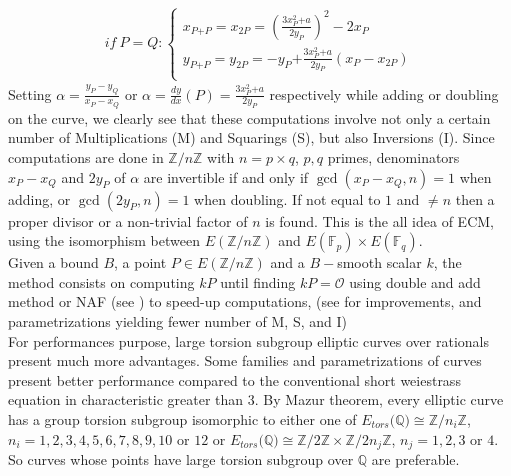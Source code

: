\documentclass[sigconf,balance=false]{acmart}
\begin{document}
\begin{enumerate}
\begin{eqnarray*}
 if \ P=Q:
\left\lbrace
\begin{array}{ll}
x_{P\text{+}P}=x_{2P}=\left(\frac{3x_{P}^{2}\text{+}a}{2y_{P}}\right)^{2}-2 x_{P}\\
y_{P\text{+}P}=y_{2P}=-y_{P}\text{+}\frac{3x_{P}^{2}\text{+}a}{2y_{P}}\left(x_{P} -x_{2P}\right)\\
\end{array} \right.
\end{eqnarray*}
Setting $\alpha =\frac{y_{P}-y_{Q}}{x_{P}-x_{Q}}$ or $\alpha = \frac{dy}{dx}\left(P\right)= \frac{3x_{P}^{2}\text{+}a}{2y_{P}}$ respectively while adding or doubling on the curve, we clearly see that these computations involve not only a certain number of Multiplications (M) and Squarings (S), but also Inversions (I).
Since computations are done in $\mathbb{Z}\text{/}n\mathbb{Z}$ with $n=p\times q$, $p, q$ primes, denominators $x_{P}-x_{Q}$ and $2y_{P}$ of $\alpha$ are invertible if and only if $\gcd(x_{P}-x_{Q}, n)=1$ when adding, or $\gcd(2y_{P}, n)=1$ when doubling. If not equal to $1$ and $\neq n$ then a proper divisor or a non-trivial factor of $n$ is found. This is the all idea of ECM, using the isomorphism between $E\left(\mathbb{Z}\text{/}n\mathbb{Z}\right)$ and $E\left(\mathbb{F}_{p}\right) \times E\left( \mathbb{F}_{q}\right)$. \\
Given a bound $B$, a point $P\in E\left(\mathbb{Z}\text{/}n\mathbb{Z}\right)$ and a $B-$smooth scalar $k$, the method consists on computing $kP$ until finding $kP=\mathcal{O}$ using double and add method or NAF (see \cite{speed1, speed2}) to speed-up computations, (see \cite{dt1, dt3, dt4, dt5} for improvements, and parametrizations yielding fewer number of M, S, and I)\\
For performances purpose, large torsion subgroup elliptic curves over rationals present much more advantages. Some families and parametrizations of curves present better performance compared to the conventional short weiestrass equation in characteristic greater than $3$. By Mazur theorem, every elliptic curve has a group torsion subgroup isomorphic to either one of $E_{tors}\text{(}\mathbb{Q}\text{)} \cong \mathbb{Z}\text{/}n_{i}\mathbb{Z}$,  $ n_{i}=1, 2, 3, 4, 5, 6, 7, 8, 9, 10$ or $12$ or $E_{tors}\text{(}\mathbb{Q}\text{)} \cong \mathbb{Z}\text{/}2\mathbb{Z}\times \mathbb{Z}\text{/}2n_{j}\mathbb{Z}$, $n_{j}=1, 2, 3$ or $4$.
So curves whose points have large torsion subgroup over $\mathbb{Q}$ are preferable. \\

\end{enumerate}
\end{document}
